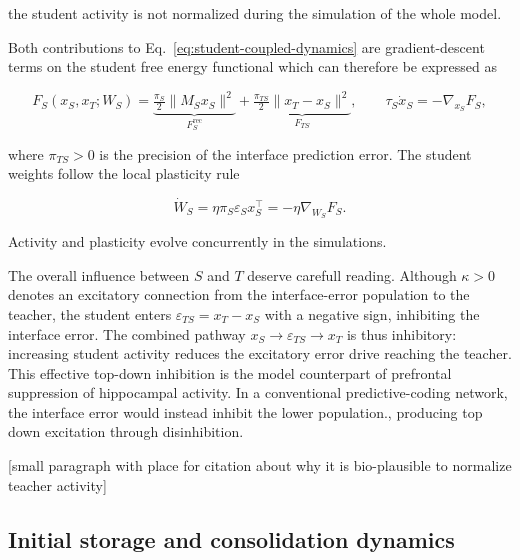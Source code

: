 \documentclass[10pt,letterpaper]{article}
\theoremstyle{plain}
\theoremstyle{remark}
\begin{document}
the student activity is not normalized during the simulation of the whole model.

Both contributions to Eq.~\eqref{eq:student-coupled-dynamics} are gradient-descent terms on the student free energy functional which can therefore be expressed as 

\begin{equation}
F_S(x_S,x_T;W_S)
=
\underbrace{\tfrac{\pi_S}{2}\|M_Sx_S\|^2}_{F_S^{\mathrm{rec}}}
+
\underbrace{\tfrac{\pi_{TS}}{2}\|x_T-x_S\|^2}_{F_{TS}},
\qquad
\tau_S\dot x_S=-\nabla_{x_S}F_S,
\label{eq:student-energy}
\end{equation}

where $\pi_{TS}>0$ is the precision of the interface prediction error. The student weights follow the local plasticity rule

\begin{equation}
\dot W_S=\eta\pi_S\varepsilon_Sx_S^\top=-\eta\nabla_{W_S}F_S.
\label{eq:student-plasticity}
\end{equation}

Activity and plasticity evolve concurrently in the simulations.

The overall influence between $S$ and $T$ deserve carefull reading. Although $\kappa>0$ denotes an excitatory connection from the interface-error population to the teacher, the student enters $\varepsilon_{TS}=x_T-x_S$ with a negative sign, inhibiting the interface error. The combined pathway $x_S\rightarrow\varepsilon_{TS}\rightarrow x_T$ is thus inhibitory: increasing student activity reduces the excitatory error drive reaching the teacher. This effective top-down inhibition is the model counterpart of prefrontal suppression of hippocampal activity. In a conventional predictive-coding network, the interface error would instead inhibit the lower population., producing top down excitation through disinhibition.


[small paragraph with place for citation about why it is bio-plausible to normalize teacher activity]

\newpage

\subsection{Initial storage and consolidation dynamics}
\label{sec:consolidation}
\end{document}
